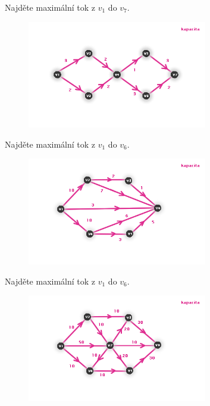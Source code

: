 \begin{t_exercise}
  \item Najděte maximální tok z $v_1$ do $v_7$.
  \begin{figure}[!htbp]
    \centering
    \includegraphics[width=0.7\textwidth]{img/net1.png}
  \end{figure}
  
  \item Najděte maximální tok z $v_1$ do $v_6$.
  \begin{figure}[!htbp]
    \centering
    \includegraphics[width=0.7\textwidth]{img/net2.png}
  \end{figure}
  
  \newpage
  \item Najděte maximální tok z $v_1$ do $v_6$.
  \begin{figure}[!htbp]
    \centering
    \includegraphics[width=0.7\textwidth]{img/net3.png}
  \end{figure}
  

\end{t_exercise}
